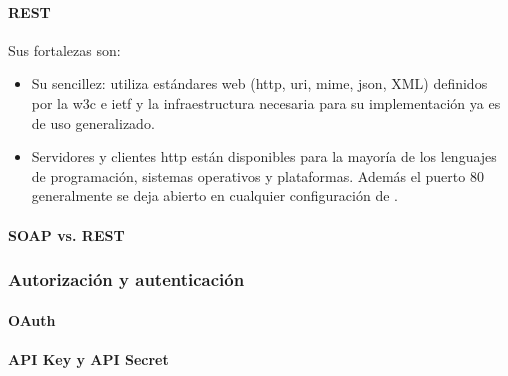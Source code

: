 \paragraph{REST}
\label{rest}

Sus fortalezas son\cite{pautasso2008restful}:
\begin{itemize}
\item Su sencillez: utiliza estándares web (\gls{http}, \gls{uri}, \gls{mime}, \gls{json}, \gls{XML}) definidos por la \gls{w3c} e \gls{ietf} y la infraestructura necesaria para su implementación ya es de uso generalizado.
\item Servidores y clientes \gls{http} están disponibles para la mayoría de los lenguajes de programación, sistemas operativos y plataformas. Además el puerto 80 generalmente se deja abierto en cualquier configuración de .
\end{itemize}

\paragraph{SOAP vs. REST}
\label{soap_vs_rest}

\subsubsection{Autorización y autenticación}
\label{autorizacion_autenticacion}

\paragraph{OAuth}
\label{oauth}

\paragraph{API Key y API Secret}
\label{apikey}
